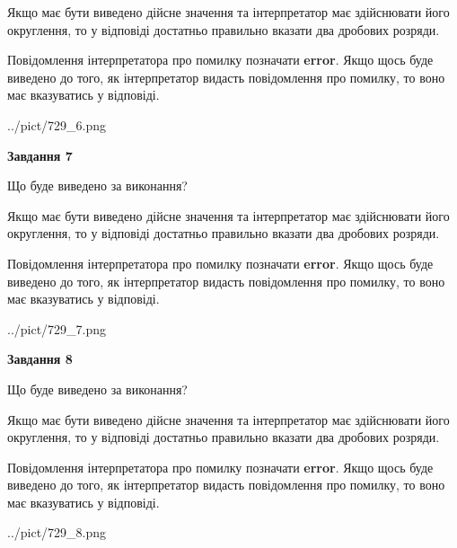 \documentclass[12pt, ukrainian]{article}
\begin{document}
{\begin {Large}
Якщо має бути виведено дійсне значення та інтерпретатор має здійснювати його округлення, 
то у відповіді достатньо правильно вказати два дробових розряди.

Повідомлення інтерпретатора про помилку позначати \textbf{error}.
Якщо щось буде виведено до того, як інтерпретатор видасть повідомлення про помилку, 
то воно має вказуватись у відповіді. \par

\begin{center}
	{../pict/729_6.png}
\end{center}
\newpage

{\begin {center}\textbf{Завдання 7}\end {center}}\par
Що буде виведено за виконання? \par

Якщо має бути виведено дійсне значення та інтерпретатор має здійснювати його округлення, 
то у відповіді достатньо правильно вказати два дробових розряди.

Повідомлення інтерпретатора про помилку позначати \textbf{error}.
Якщо щось буде виведено до того, як інтерпретатор видасть повідомлення про помилку, 
то воно має вказуватись у відповіді. \par

\begin{center}
	{../pict/729_7.png}
\end{center}
\newpage

{\begin {center}\textbf{Завдання 8}\end {center}}\par
Що буде виведено за виконання? \par

Якщо має бути виведено дійсне значення та інтерпретатор має здійснювати його округлення, 
то у відповіді достатньо правильно вказати два дробових розряди.

Повідомлення інтерпретатора про помилку позначати \textbf{error}.
Якщо щось буде виведено до того, як інтерпретатор видасть повідомлення про помилку, 
то воно має вказуватись у відповіді. \par

\begin{center}
	{../pict/729_8.png}
\end{center}
\newpage


\end{Large}}
\end{document}
